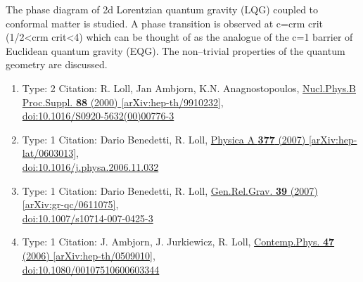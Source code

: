 \documentclass[a4paper,10pt]{article}
\begin{document}
\begin{enumerate}
The phase diagram of 2d Lorentzian quantum gravity (LQG) coupled to conformal matter is studied. A phase transition is observed at c=c{rm crit} (1/2<c{rm crit}<4) which can be thought of as the analogue of the c=1 barrier of Euclidean quantum gravity (EQG). The non--trivial properties of the quantum geometry are discussed.
\begin{enumerate}
  \item Type: 2 Citation: R. Loll, Jan Ambjorn, K.N. Anagnostopoulos, \href{https://www.doi.org/10.1016/S0920-5632(00)00776-3}{Nucl.Phys.B Proc.Suppl. {\bf 88} (2000) }  \href{https://arxiv.org/abs/hep-th/9910232}{[arXiv:hep-th/9910232]},\\\href{https://www.doi.org/10.1016/S0920-5632(00)00776-3}{doi:10.1016/S0920-5632(00)00776-3}
  \item Type: 1 Citation: Dario Benedetti, R. Loll, \href{https://www.doi.org/10.1016/j.physa.2006.11.032}{Physica A {\bf 377} (2007) }  \href{https://arxiv.org/abs/hep-lat/0603013}{[arXiv:hep-lat/0603013]},\\\href{https://www.doi.org/10.1016/j.physa.2006.11.032}{doi:10.1016/j.physa.2006.11.032}
  \item Type: 1 Citation: Dario Benedetti, R. Loll, \href{https://www.doi.org/10.1007/s10714-007-0425-3}{Gen.Rel.Grav. {\bf 39} (2007) }  \href{https://arxiv.org/abs/gr-qc/0611075}{[arXiv:gr-qc/0611075]},\\\href{https://www.doi.org/10.1007/s10714-007-0425-3}{doi:10.1007/s10714-007-0425-3}
  \item Type: 1 Citation: J. Ambjorn, J. Jurkiewicz, R. Loll, \href{https://www.doi.org/10.1080/00107510600603344}{Contemp.Phys. {\bf 47} (2006) }  \href{https://arxiv.org/abs/hep-th/0509010}{[arXiv:hep-th/0509010]},\\\href{https://www.doi.org/10.1080/00107510600603344}{doi:10.1080/00107510600603344}

\end{enumerate}
\end{enumerate}
\end{document}
